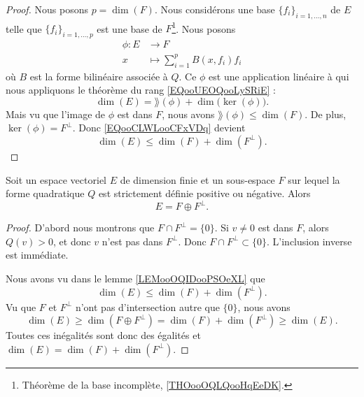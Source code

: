 \begin{proof}
    Nous posons \( p=\dim(F)\). Nous considérons une base \( \{ f_i \}_{i=1,\ldots, n}\) de \( E\) telle que \( \{ f_i \}_{i=1,\ldots, p}\) est une base de \( F\)\footnote{Théorème de la base incomplète, \ref{THOooOQLQooHqEeDK}.}. Nous posons
    \begin{equation}
        \begin{aligned}
            \phi\colon E&\to F \\
            x&\mapsto \sum_{i=1}^pB(x,f_i)f_i 
        \end{aligned}
    \end{equation}
    où \( B\) est la forme bilinéaire associée à \( Q\). Ce \( \phi\) est une application linéaire à qui nous appliquons le théorème du rang \eqref{EQooUEOQooLySRiE} :
    \begin{equation}        \label{EQooCLWLooCFxVDq}
        \dim(E)=\rang(\phi)+\dim\big( \ker(\phi) \big).
    \end{equation}
    Mais vu que l'image de \( \phi\) est dans \( F\), nous avons \( \rang(\phi)\leq \dim(F)\). De plus, \( \ker(\phi)=F^{\perp}\). Donc \eqref{EQooCLWLooCFxVDq} devient
    \begin{equation}
        \dim(E)\leq \dim(F)+\dim(F^{\perp}).
    \end{equation}
\end{proof}

\begin{lemma}     \label{LEMooUOZOooYvEcji}
    Soit un espace vectoriel \( E\) de dimension finie et un sous-espace \( F\) sur lequel la forme quadratique \( Q\) est strictement définie positive ou négative. Alors
    \begin{equation}
        E=F\oplus F^{\perp}.
    \end{equation}
\end{lemma}

\begin{proof}
    D'abord nous montrons que \( F\cap F^{\perp}=\{ 0 \}\). Si \( v\neq 0\) est dans \( F\), alors \( Q(v)>0\), et donc \( v\) n'est pas dans \( F^{\perp}\). Donc \( F\cap F^{\perp}\subset \{ 0 \}\). L'inclusion inverse est immédiate.

    Nous avons vu dans le lemme \ref{LEMooOQIDooPSOeXL} que
    \begin{equation}
        \dim(E)\leq \dim(F)+\dim(F^{\perp}).
    \end{equation}
    Vu que \( F\) et \( F^{\perp}\) n'ont pas d'intersection autre que \( \{ 0 \}\), nous avons
    \begin{equation}
        \dim(E)\geq\dim(F\oplus F^{\perp}) = \dim(F)+\dim(F^{\perp}) \geq\dim(E).
    \end{equation}
    Toutes ces inégalités sont donc des égalités et \( \dim(E)=\dim(F)+\dim(F^{\perp})\).
\end{proof}

